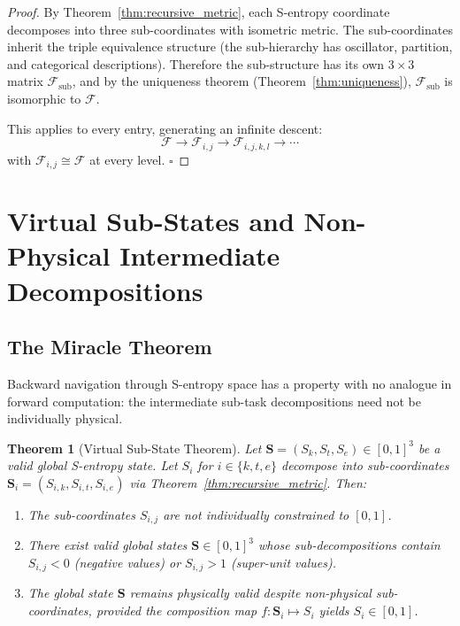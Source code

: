 \documentclass[12pt,twocolumn]{article}
\newtheorem{theorem}{Theorem}[section]
\begin{document}
\begin{proof}
By Theorem~\ref{thm:recursive_metric}, each S-entropy coordinate decomposes into three sub-coordinates with isometric metric. The sub-coordinates inherit the triple equivalence structure (the sub-hierarchy has oscillator, partition, and categorical descriptions). Therefore the sub-structure has its own $3 \times 3$ matrix $\mathcal{F}_{\text{sub}}$, and by the uniqueness theorem (Theorem~\ref{thm:uniqueness}), $\mathcal{F}_{\text{sub}}$ is isomorphic to $\mathcal{F}$.

This applies to every entry, generating an infinite descent:
\begin{equation}
\mathcal{F} \to \mathcal{F}_{i,j} \to \mathcal{F}_{i,j,k,l} \to \cdots
\end{equation}
with $\mathcal{F}_{i,j} \cong \mathcal{F}$ at every level. $\square$
\end{proof}


\section{Virtual Sub-States and Non-Physical Intermediate Decompositions}
\label{sec:virtual}

\subsection{The Miracle Theorem}

Backward navigation through S-entropy space has a property with no analogue in forward computation: the intermediate sub-task decompositions need not be individually physical.

\begin{theorem}[Virtual Sub-State Theorem]
\label{thm:virtual}
Let $\mathbf{S} = (S_k, S_t, S_e) \in [0,1]^3$ be a valid global S-entropy state. Let $S_i$ for $i \in \{k, t, e\}$ decompose into sub-coordinates $\mathbf{S}_i = (S_{i,k}, S_{i,t}, S_{i,e})$ via Theorem~\ref{thm:recursive_metric}. Then:
\begin{enumerate}
\item The sub-coordinates $S_{i,j}$ are not individually constrained to $[0,1]$.
\item There exist valid global states $\mathbf{S} \in [0,1]^3$ whose sub-decompositions contain $S_{i,j} < 0$ (negative values) or $S_{i,j} > 1$ (super-unit values).
\item The global state $\mathbf{S}$ remains physically valid despite non-physical sub-coordinates, provided the composition map $f: \mathbf{S}_i \mapsto S_i$ yields $S_i \in [0,1]$.
\end{enumerate}
\end{theorem}
\end{document}
